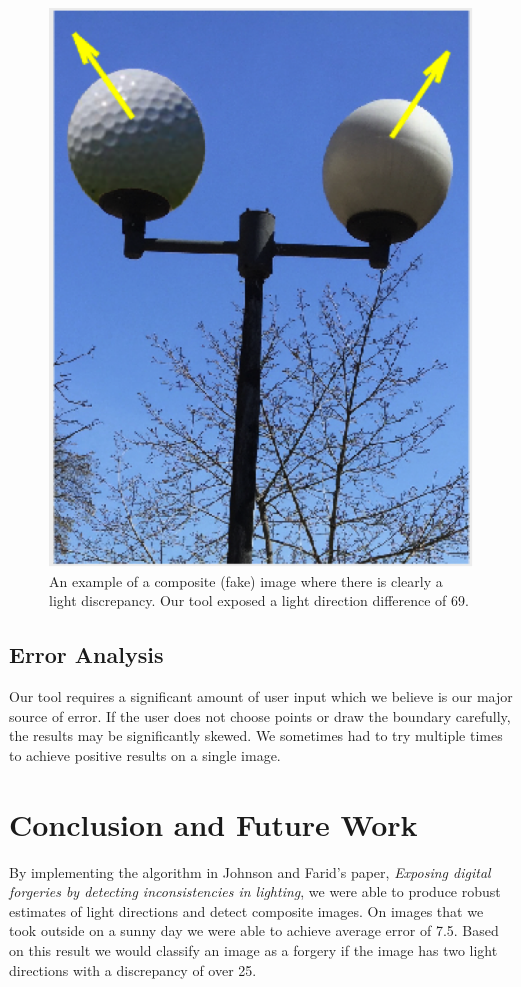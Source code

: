 \documentclass[10pt,twocolumn,letterpaper]{article}
\begin{document}
\begin{figure}[htpb]
\begin{center}
	\includegraphics[width=0.9\linewidth]{golfball_fake_labeled.png}
\end{center}
	\caption{An example of a composite (fake) image where there is clearly a light discrepancy. Our tool exposed a light direction difference of 69\textdegree.}
\label{img:golfFake}
\end{figure}

\subsection{Error Analysis}
Our tool requires a significant amount of user input which we believe is our major source of error. If the user does not choose points or draw the boundary carefully, the results may be significantly skewed. We sometimes had to try multiple times to achieve positive results on a single image.

\section{Conclusion and Future Work}
By implementing the algorithm in Johnson and Farid's paper, \emph{Exposing digital forgeries by detecting inconsistencies in lighting}, we were able to produce robust estimates of light directions and detect composite images. On images that we took outside on a sunny day we were able to achieve average error of 7.5\textdegree. Based on this result we would classify an image as a forgery if the image has two light directions with a discrepancy of over 25\textdegree. 
 
\end{document}
